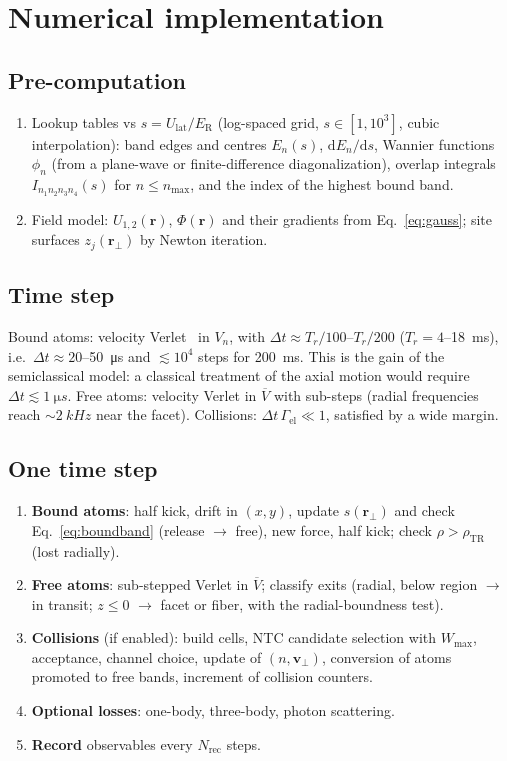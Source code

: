 \documentclass[11pt,a4paper]{article}
\newcommand{\dd}{\mathrm{d}}
\newcommand{\ER}{E_\mathrm{R}}
\newcommand{\Ulat}{U_\mathrm{lat}}
\newcommand{\vperp}{\bm{v}_\perp}
\newcommand{\rperp}{\bm{r}_\perp}
\begin{document}
\section{Numerical implementation}
\label{sec:numerics}

\subsection{Pre-computation}
\begin{enumerate}[leftmargin=*]
\item Lookup tables vs $s=\Ulat/\ER$ (log-spaced grid, $s\in[1,10^3]$, cubic interpolation): band edges and centres $E_n(s)$, $\dd E_n/\dd s$, Wannier functions $\phi_n$ (from a plane-wave or finite-difference diagonalization), overlap integrals $I_{n_1n_2n_3n_4}(s)$ for $n\le n_\mathrm{max}$, and the index of the highest bound band.
\item Field model: $U_{1,2}(\bm r)$, $\Phi(\bm r)$ and their gradients from Eq.~\eqref{eq:gauss}; site surfaces $z_j(\rperp)$ by Newton iteration.
\end{enumerate}

\subsection{Time step}
Bound atoms: velocity Verlet~\cite{Hairer2006} in $V_n$, with $\Delta t\approx T_r/100$--$T_r/200$ ($T_r=4$--\SI{18}{ms}), i.e.\ $\Delta t\approx20$--\SI{50}{\micro s} and $\lesssim10^4$ steps for \SI{200}{ms}. This is the gain of the semiclassical model: a classical treatment of the axial motion would require $\Delta t\lesssim\SI{1}{\micro s}$. Free atoms: velocity Verlet in $\overline V$ with sub-steps (radial frequencies reach $\sim\SI{2}{kHz}$ near the facet). Collisions: $\Delta t\,\Gamma_\mathrm{el}\ll1$, satisfied by a wide margin.

\subsection{One time step}
\begin{enumerate}[leftmargin=*]
\item \textbf{Bound atoms}: half kick, drift in $(x,y)$, update $s(\rperp)$ and check Eq.~\eqref{eq:boundband} (release $\to$ free), new force, half kick; check $\rho>\rho_\mathrm{TR}$ (lost radially).
\item \textbf{Free atoms}: sub-stepped Verlet in $\overline V$; classify exits (radial, below region $\to$ in transit; $z\le0$ $\to$ facet or fiber, with the radial-boundness test).
\item \textbf{Collisions} (if enabled): build cells, NTC candidate selection with $W_\mathrm{max}$, acceptance, channel choice, update of $(n,\vperp)$, conversion of atoms promoted to free bands, increment of collision counters.
\item \textbf{Optional losses}: one-body, three-body, photon scattering.
\item \textbf{Record} observables every $N_\mathrm{rec}$ steps.
\end{enumerate}
\end{document}
